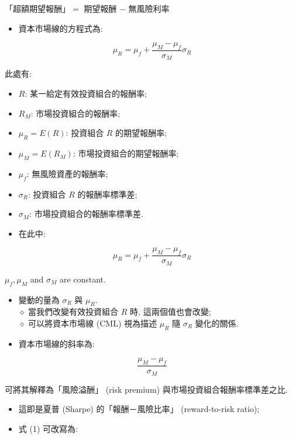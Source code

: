 \documentclass[letterpaper]{article}
\begin{document}
「超額期望報酬」$=$ 期望報酬 $-$ 無風險利率

\begin{itemize}
	\item 資本市場線的方程式為: 
\end{itemize}



\begin{equation*}
\mu_{R}=\mu_{f}+\frac{\mu_{M}-\mu_{f}}{\sigma_{M}} \sigma_{R} \tag{1}
\end{equation*}


此處有: 

\begin{itemize}
	\item $R$: 某一給定有效投資組合的報酬率; 
	\item $R_{M}$: 市場投資組合的報酬率; 
	\item $\mu_{R} = E (R) $: 投資組合 $R$ 的期望報酬率; 
	\item $\mu_{M} = E (R_{M}) $: 市場投資組合的期望報酬率; 
	\item $\mu_{f}$: 無風險資產的報酬率; 
	\item $\sigma_{R}$: 投資組合 $R$ 的報酬率標準差; 
	\item $\sigma_{M}$: 市場投資組合的報酬率標準差. 
\end{itemize}


\begin{itemize}
  \item 在此中: 
\end{itemize}

$$
\mu_{R}=\mu_{f}+\frac{\mu_{M}-\mu_{f}}{\sigma_{M}} \sigma_{R}
$$

$\mu_{f}, \mu_{M}$ and $\sigma_{M}$ are constant.

\begin{itemize}
	\item 變動的量為 $\sigma_{R}$ 與 $\mu_{R}$. \\
	$\diamond$ 當我們改變有效投資組合 $R$ 時, 這兩個值也會改變; \\
	$\diamond$ 可以將資本市場線 (CML) 視為描述 $\mu_{R}$ 隨 $\sigma_{R}$ 變化的關係. 
	\item 資本市場線的斜率為: 
\end{itemize}


$$
\frac{\mu_{M}-\mu_{f}}{\sigma_{M}}
$$

可將其解釋為「風險溢酬」 (risk premium) 與市場投資組合報酬率標準差之比. 

\begin{itemize}
	\item 這即是夏普 (Sharpe) 的「報酬－風險比率」 (reward-to-risk ratio); 
	\item 式 (1) 可改寫為: 
\end{itemize}
\end{document}
